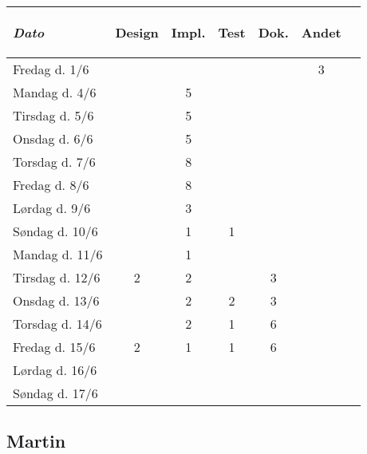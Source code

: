 \documentclass[a4paper]{article}
\begin{document}
\begin{tabular}{l | c c c c c | c}

  \emph{Dato}
  & \begin{sideways}Design\end{sideways} 
  & \begin{sideways}Impl.\end{sideways} 
  & \begin{sideways}Test\end{sideways} 
  & \begin{sideways}Dok.\end{sideways} 
  & \begin{sideways}Andet\end{sideways} \\
  \hline
  Fredag d. 1/6   &   &   &   &   & 3 \\
  Mandag d. 4/6   &   & 5 &   &   & \\
  Tirsdag d. 5/6  &   & 5 &   &   & \\
  Onsdag d. 6/6   &   & 5 &   &   & \\
  Torsdag d. 7/6  &   & 8 &   &   & \\
  Fredag d. 8/6   &   & 8 &   &   & \\
  Lørdag d. 9/6   &   & 3 &   &   & \\
  Søndag d. 10/6  &   & 1 & 1 &   & \\
  Mandag d. 11/6  &   & 1 &   &   & \\
  Tirsdag d. 12/6 & 2 & 2 &   & 3 & \\
  Onsdag d. 13/6  &   & 2 & 2 & 3 & \\
  Torsdag d. 14/6 &   & 2 & 1 & 6 & \\
  Fredag d. 15/6  & 2 & 1 & 1 & 6 & \\
  Lørdag d. 16/6  &   &   &   &   & \\
  Søndag d. 17/6  &   &   &   &   & \\

\end{tabular}


\subsection{Martin} %
\end{document}
